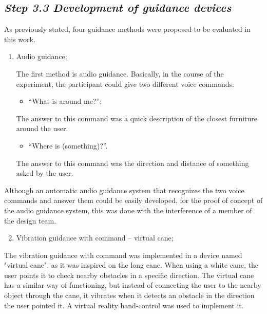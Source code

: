     \subsection*{\textit{Step 3.3 Development of guidance devices}}

        As previously stated, four guidance methods were proposed to be evaluated in this work.
        
        \begin{enumerate} [label = \Alph*)]
            \item Audio guidance;
            
            The first method is audio guidance. Basically, in the course of the experiment, the participant could give two different voice commands:

            \begin{itemize} [label = --]
                \item “What is around me?”;
            \end{itemize}

            The answer to this command was a quick description of the closest furniture around the user.

            \begin{itemize} [label = --]
                \item “Where is (something)?”.
            \end{itemize}

            The answer to this command was the direction and distance of something asked by the user.

        \end{enumerate}

        Although an automatic audio guidance system that recognizes the two voice commands and answer them could be easily developed, for the proof of concept of the audio guidance system, this was done with the interference of a member of the design team.

        \begin{enumerate} [label = \Alph*)]
            \setcounter{enumi}{1}
            \item Vibration guidance with command – virtual cane;
        \end{enumerate}

        The vibration guidance with command was implemented in a device named "virtual cane", as it was inspired on the long cane. When using a white cane, the user points it to check nearby obstacles in a specific direction. The virtual cane has a similar way of functioning, but instead of connecting the user to the nearby object through the cane, it vibrates when it detects an obstacle in the direction the user pointed it. A virtual reality hand-control was used to implement it. 

